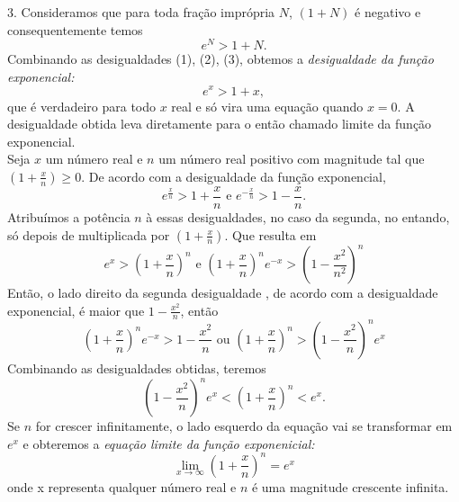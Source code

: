 3. Consideramos que para toda fração imprópria $N$, $(1+N)$ é negativo e consequentemente temos
\begin{equation}
e^{N} > 1 + N.
\end{equation}
Combinando as desigualdades (1), (2), (3), obtemos a \textit{desigualdade da função exponencial:}
$$e^{x} > 1 + x, $$
que é verdadeiro para todo $x$ real e só vira uma equação quando $x=0$. A desigualdade obtida leva diretamente para o então chamado limite da função exponencial.\\
Seja $x$ um número real e $n$ um número real positivo com magnitude tal que $\left(1 + \frac{x}{n}\right) \geq 0$. De acordo com a desigualdade da função exponencial,
$$e^{\frac{x}{n}} > 1 + \frac{x}{n} \textrm{  e  } e^{-\frac{x}{n}} > 1 - \frac{x}{n}.$$
Atribuímos a potência $n$ à essas desigualdades, no caso da segunda, no entando, só depois de multiplicada por $\left(1+ \frac{x}{n}\right)$. Que resulta em
$$e^{x} > \left(1+\frac{x}{n}\right)^{n} \textrm{  e  } \left(1+\frac{x}{n}\right)^{n}e^{-x} > \left(1-\frac{x^{2}}{n^{2}}\right)^{n}$$  
Então, o lado direito da segunda desigualdade , de acordo com a desigualdade exponencial, é maior que $1 - \frac{x^{2}}{n}$, então
$$\left(1 + \frac{x}{n}\right)^{n}e^{-x} > 1 - \frac{x^{2}}{n} \textrm{  ou  }  \left(1 + \frac{x}{n}\right)^{n} > \left(1 - \frac{x^{2}}{n}\right)^{n}e^{x}$$
Combinando as desigualdades obtidas, teremos
$$\left(1 - \frac{x^{2}}{n}\right)^{n}e^{x} <  \left(1 + \frac{x}{n}\right)^{n} < e^{x}.$$
Se $n$ for crescer infinitamente, o lado esquerdo da equação vai se transformar em $e^{x}$ e obteremos a \textit{equação limite da função exponenicial:}
$$\lim_{x\rightarrow \infty} \left( 1 + \frac{x}{n}\right)^{n} = e^{x} $$
onde x representa qualquer número real e $n$ é uma magnitude crescente infinita.                

